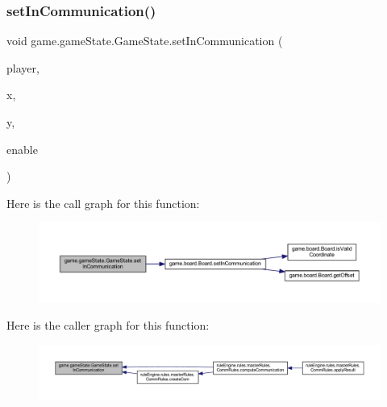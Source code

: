 \subsubsection{\texorpdfstring{set\+In\+Communication()}{setInCommunication()}}
{\footnotesize\ttfamily void game.\+game\+State.\+Game\+State.\+set\+In\+Communication (\begin{DoxyParamCaption}\item[{\mbox{\hyperlink{enumgame_1_1_e_player}{E\+Player}}}]{player,  }\item[{int}]{x,  }\item[{int}]{y,  }\item[{boolean}]{enable }\end{DoxyParamCaption})\hspace{0.3cm}{\ttfamily [inline]}}

Here is the call graph for this function\+:
\nopagebreak
\begin{figure}[H]
\begin{center}
\leavevmode
\includegraphics[width=350pt]{classgame_1_1game_state_1_1_game_state_a4e627b92bbb28941616c628ae393baa6_cgraph}
\end{center}
\end{figure}
Here is the caller graph for this function\+:
\nopagebreak
\begin{figure}[H]
\begin{center}
\leavevmode
\includegraphics[width=350pt]{classgame_1_1game_state_1_1_game_state_a4e627b92bbb28941616c628ae393baa6_icgraph}
\end{center}
\end{figure}
\mbox{\label{classgame_1_1game_state_1_1_game_state_a6b65e481b29441ea54040f36144b1d8b}} 
